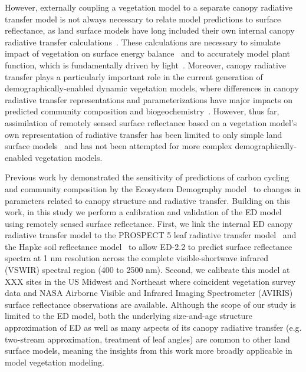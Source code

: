 However, externally coupling a vegetation model to a separate canopy radiative transfer model is not always necessary to relate model predictions to surface reflectance,
as land surface models have long included their own internal canopy radiative transfer calculations~\citep{dickinson1983land, sellers1985canopy}.
These calculations are necessary to simulate impact of vegetation on surface energy balance~\citep{bonan2008forests} and to accurately model plant function, which is fundamentally driven by light~\citep{hikosaka1995model, robakowski_2004_growth, niinemets2016withincanopy, keenan2016global}.
Moreover, canopy radiative transfer plays a particularly important role in the current generation of demographically-enabled dynamic vegetation models, where differences in canopy radiative transfer representations and parameterizations have major impacts on predicted community composition and biogeochemistry~\citep{loew_2014_do, fisher2017vegetation, viskari_2019_influence}.
However, thus far, assimilation of remotely sensed surface reflectance based on a vegetation model's own representation of radiative transfer has been limited to only simple land surface models~\citep[e.g. SiPNET][]{zobitz_2014_joint} and has not been attempted for more complex demographically-enabled vegetation models.

Previous work by \citet{viskari_2019_influence} demonstrated the sensitivity of predictions of carbon cycling and community composition by the Ecosystem Demography model~\citep{medvigy2009mechanistic} to changes in parameters related to canopy structure and radiative transfer.
Building on this work, in this study we perform a calibration and validation of the ED model using remotely sensed surface reflectance.
First, we link the internal ED canopy radiative transfer model to the PROSPECT 5 leaf radiative transfer model~\citep{feret2008prospect4} and the Hapke soil reflectance model~\citep{verhoef2007coupled} to allow ED-2.2 to predict surface reflectance spectra at 1 nm resolution across the complete visible-shortwave infrared (VSWIR) spectral region (400 to 2500 nm).
Second, we calibrate this model at XXX sites in the US Midwest and Northeast where coincident vegetation survey data and NASA Airborne Visible and Infrared Imaging Spectrometer (AVIRIS) surface reflectance observations are available.
Although the scope of our study is limited to the ED model, both the underlying size-and-age structure approximation of ED as well as many aspects of its canopy radiative transfer (e.g. two-stream approximation, treatment of leaf angles) are common to other land surface models, meaning the insights from this work more broadly applicable in model vegetation modeling.
